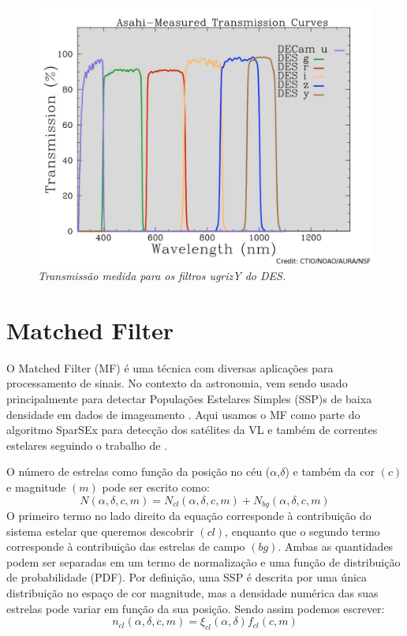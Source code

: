 \documentclass[
	12pt,				%
	openany,			%
	oneside,			%
	a4paper,			%
	english,			%
	brazil				%
	]{abntex2}
\begin{document}
\begin{figure}[h]
\begin{center}
\includegraphics[width=12cm]{figuras/passbands.pdf}
\caption{\textit{Transmissão medida para os filtros ugrizY do DES. }}
\label{fig:passbands}
\end{center}
\end{figure}
\vspace{0.5cm}



\chapter{Matched Filter}
O Matched Filter (MF) é uma técnica com diversas aplicações para processamento de sinais. No contexto da astronomia, vem sendo usado principalmente para detectar Populações Estelares Simples (SSP)s de baixa densidade em dados de imageamento \cite{2012ASPC..458..219G,2009AAS...21344217D}. Aqui usamos o MF como parte do algoritmo SparSEx para detecção dos satélites da VL e também de correntes estelares seguindo o trabalho de \cite{2011MNRAS.416..393B}. \par
O número de estrelas como função da posição no céu ($\alpha$,$\delta$)  e também da cor $(c)$ e magnitude $(m)$ pode ser escrito como:
\begin{equation} \label{eq:densnum}
N(\alpha,\delta,c,m) = N_{cl}(\alpha,\delta,c,m)+ N_{bg} (\alpha,\delta,c,m) 
\end{equation}
O primeiro termo no lado direito da equação corresponde à contribuição do sistema estelar que queremos descobrir $(cl)$, enquanto que o segundo termo corresponde à contribuição das estrelas de campo $(bg)$. Ambas as quantidades podem ser separadas em um termo de normalização e uma função de distribuição de probabilidade (PDF). Por definição, uma SSP é descrita por uma única distribuição no espaço de cor magnitude, mas a densidade numérica das suas estrelas pode variar em função da sua posição. Sendo assim podemos escrever:
\begin{equation}
n_{cl}(\alpha,\delta,c,m) = \xi_{cl}(\alpha,\delta)f_{cl} (c,m) 
\end{equation}
\end{document}
